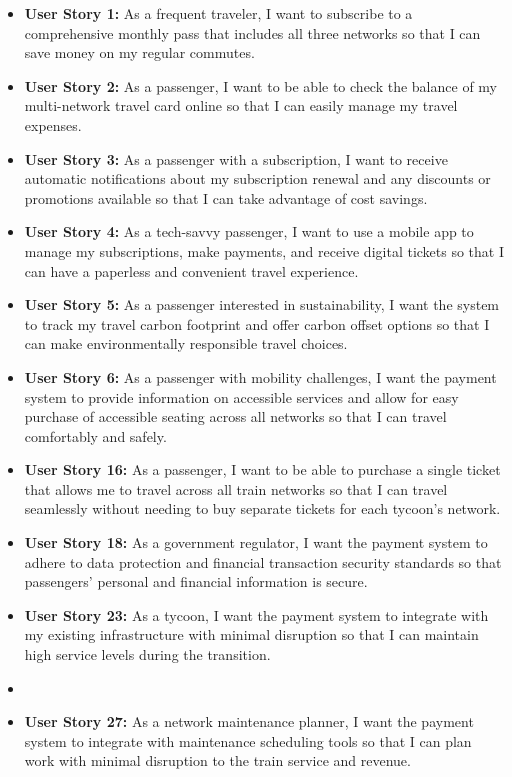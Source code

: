\begin{itemize}[noitemsep]
    \item \textbf{User Story 1:} As a frequent traveler, I want to subscribe to a comprehensive monthly pass that includes all three networks so that I can save money on my regular commutes.
    
    \item \textbf{User Story 2:} As a passenger, I want to be able to check the balance of my multi-network travel card online so that I can easily manage my travel expenses.
    
    \item \textbf{User Story 3:} As a passenger with a subscription, I want to receive automatic notifications about my subscription renewal and any discounts or promotions available so that I can take advantage of cost savings. 
    
    \item \textbf{User Story 4:} As a tech-savvy passenger, I want to use a mobile app to manage my subscriptions, make payments, and receive digital tickets so that I can have a paperless and convenient travel experience. 
    
    \item \textbf{User Story 5:} As a passenger interested in sustainability, I want the system to track my travel carbon footprint and offer carbon offset options so that I can make environmentally responsible travel choices.
    
    \item \textbf{User Story 6:} As a passenger with mobility challenges, I want the payment system to provide information on accessible services and allow for easy purchase of accessible seating across all networks so that I can travel comfortably and safely.
    
    \item \textbf{User Story 16:} As a passenger, I want to be able to purchase a single ticket that allows me to travel across all train networks so that I can travel seamlessly without needing to buy separate tickets for each tycoon's network.
    
    \item \textbf{User Story 18:} As a government regulator, I want the payment system to adhere to data protection and financial transaction security standards so that passengers' personal and financial information is secure.
    
    \item \textbf{User Story 23:} As a tycoon, I want the payment system to integrate with my existing infrastructure with minimal disruption so that I can maintain high service levels during the transition.
    \item 
    \item \textbf{User Story 27:} As a network maintenance planner, I want the payment system to integrate with maintenance scheduling tools so that I can plan work with minimal disruption to the train service and revenue.
\end{itemize}

